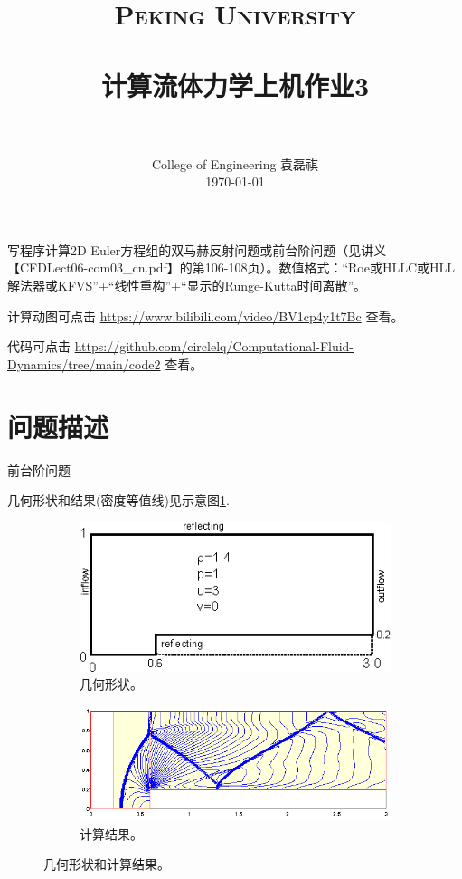 \documentclass[12pt]{article}
\title{
		\vspace{-1in} 	
		\usefont{OT1}{bch}{b}{n}
		\normalfont \normalsize \textsc{\LARGE Peking University}\\[0.2cm] %
		\horrule{0.5pt} \\[0.2cm]
		\huge \bfseries{计算流体力学上机作业3} \\[-0.2cm]
		\horrule{2pt} \\[0.2cm]
}
\author{
		\normalfont 								\normalsize
		College of Engineering \quad 2001111690  \quad 袁磊祺\\	\normalsize
        \today
}
\date{}
\begin{document}


\maketitle


写程序计算2D Euler方程组的双马赫反射问题或前台阶问题（见讲义【CFDLect06-com03_cn.pdf】的第106-108页）。数值格式：“Roe或HLLC或HLL解法器或KFVS”+“线性重构”+“显示的Runge-Kutta时间离散”。

计算动图可点击 \href{https://www.bilibili.com/video/BV1cp4y1t7Bc}{https://www.bilibili.com/video/BV1cp4y1t7Bc} 查看。

代码可点击 \href{https://github.com/circlelq/Computational-Fluid-Dynamics/tree/main/code2}{https://github.com/circlelq/Computational-Fluid-Dynamics/tree/main/code2} 查看。

\section{问题描述}

前台阶问题

几何形状和结果(密度等值线)见示意图\cref{fig:init}.

\begin{figure}
	\centering
	\begin{subfigure}[b]{0.49\textwidth}
		\centering
		\includegraphics[width=\textwidth]{pro1.png}
		\caption{几何形状。}
	\end{subfigure}
	\hfill
	\begin{subfigure}[b]{0.49\textwidth}
		\centering
		\includegraphics[width=\textwidth]{pro2.png}
		\caption{计算结果。}
	\end{subfigure}
	\caption{几何形状和计算结果。}
	\label{fig:init}
\end{figure}
\end{document}
